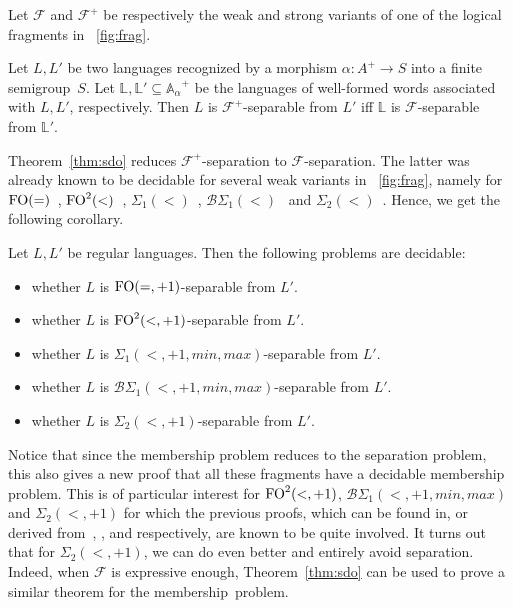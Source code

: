 \documentclass[a4paper,USenglish]{lipics}
\newcommand\Abb{\ensuremath{\mathbb{A}}\xspace}
\newcommand\Lbb{\ensuremath{\mathbb{L}}\xspace}
\newcommand\Fs{\ensuremath{\mathcal{F}}\xspace}
\newcommand{\plus}{\ensuremath{+1,min,max}}
\newcommand{\sio}[1]{\ensuremath{\Sigma_{#1}(<)}\xspace}
\newcommand{\sip}[1]{\ensuremath{\Sigma_{#1}(<,\plus)}\xspace}
\newcommand{\bso}[1]{\ensuremath{\mathcal{B}\Sigma_{#1}(<)}\xspace}
\newcommand{\bsp}[1]{\ensuremath{\mathcal{B}\Sigma_{#1}(<,\plus)}\xspace}
\newcommand{\sdp}{\ensuremath{\Sigma_{2}(<,+1)}\xspace}
\newcommand{\sdo}{\sio{2}}
\newcommand{\foeq}{\ensuremath{\textup{FO}(=)}\xspace}
\newcommand{\fod}{\ensuremath{\textup{FO}^2(<)}\xspace}
\newcommand{\foeqp}{\ensuremath{\textup{FO}(=,+1)}\xspace}
\newcommand{\fodp}{\ensuremath{\textup{FO}^2(<,+1)}\xspace}
\newcommand\wfA{\ensuremath{\Abb_\alpha}\xspace}
\theoremstyle{plain}
\begin{document}
\begin{theorem} \label{thm:sdo}
  Let \Fs and $\Fs^+$ be respectively the weak and strong variants of
  one of the logical fragments in \figurename~\ref{fig:frag}.

  Let $L,L'$ be two languages recognized by a morphism $\alpha: A^+
  \rightarrow S$ into a finite semigroup~$S$. Let $\Lbb,
  \Lbb'\subseteq\wfA^+$ be the languages of well-formed words associated
  with $L,L'$, respectively. Then $L$ is $\Fs^+$-separable from $L'$
  iff\/ $\Lbb$ is $\Fs$-separable from $\Lbb'$.
\end{theorem}

Theorem~\ref{thm:sdo} reduces $\Fs^+$-separation to \Fs-separation. The latter
was already known to be decidable for several weak variants in
\figurename~\ref{fig:frag}, namely for \foeq~\cite{ltltt:2013},
\fod~\cite{DBLP:conf/mfcs/PlaceRZ13}, $\sio 1$~\cite{sep_icalp13},
$\bso 1$~\cite{sep_icalp13,DBLP:conf/mfcs/PlaceRZ13} and
\sdo~\cite{PZ:icalp14}. Hence, we get the following corollary.

\begin{corollary} \label{cor:sdp}
  Let $L,L'$ be regular languages. Then the following problems are
  decidable:
  \begin{itemize}
  \item whether $L$ is \foeqp-separable from $L'$.
  \item whether $L$ is \fodp-separable from $L'$.
  \item whether $L$ is $\sip 1$-separable from $L'$.
  \item whether $L$ is $\bsp 1$-separable from $L'$.
  \item whether $L$ is \sdp-separable from $L'$.
  \end{itemize}
\end{corollary}

Notice that since the membership problem reduces to the separation problem,
this also gives a new proof that all these fragments have a decidable
membership problem. This is of particular interest for $\fodp$, $\bsp 1$
and \sdp for which the previous proofs, which can be found in, or derived from~\cite{Str85,Almeida:1996c,PSDAD},
\cite{Knast:dd1:1983a}, and \cite{glasser-dd3/2,pw:wreath,pwdelta} respectively, are known to be quite
involved. It turns out that for \sdp, we can do even better and entirely avoid
separation. Indeed, when \Fs is expressive enough, Theorem~\ref{thm:sdo} can be
used to prove a similar theorem for the membership~problem.
\end{document}
